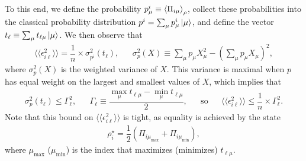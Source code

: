 \documentclass[a4paper,twocolumn,unpublished]{quantumarticle}
\renewcommand{\t}{\text} %
\newcommand{\f}[2]{\dfrac{#1}{#2}} %
\newcommand{\p}[1]{\left(#1\right)} %
\newcommand{\bk}{\Braket} %
\newcommand{\bbk}[1]{\langle\!\langle #1 \rangle\!\rangle}
\begin{document}
To this end, we define the probability $p^i_\mu\equiv\bk{\Pi_{i\mu}}_\rho$, collect these probabilities into the classical probability distribution $p^i = \sum_\mu p^i_\mu \ket{\mu}$, and define the vector $t_\ell \equiv \sum_\mu t_{\ell\mu} \ket{\mu}$.
We then observe that
\begin{align}
  \bbk{\epsilon_{i\ell}^2} = \f1n \times \sigma_{p^i}^2\p{t_\ell},
  &&
  \sigma_p^2\p{X}
  \equiv \sum_\mu p_\mu X_\mu^2 - \p{\sum_\mu p_\mu X_\mu}^2,
\end{align}
where $\sigma_p^2\p{X}$ is the weighted variance of $X$.
This variance is maximal when $p$ has equal weight on the largest and smallest values of $X$, which implies that
\begin{align}
  \sigma_p^2\p{t_\ell} \le \Gamma_\ell^2,
  &&
  \Gamma_\ell \equiv \f{\max_\mu t_{\ell\mu} - \min_\mu t_{\ell\mu}}{2},
  &&
  \t{so}
  &&
  \bbk{\epsilon_{i\ell}^2} \le \f1n \times \Gamma_\ell^2.
\end{align}
Note that this bound on $\bbk{\epsilon_{i\ell}^2}$ is tight, as equality is achieved by the state
\begin{align}
  \rho_i^\star = \f12\p{\Pi_{i\mu_{\t{max}}} + \Pi_{i\mu_{\t{min}}}},
\end{align}
where $\mu_{\t{max}}$ ($\mu_{\t{min}}$) is the index that maximizes (minimizes) $t_{\ell\mu}$.
\end{document}
